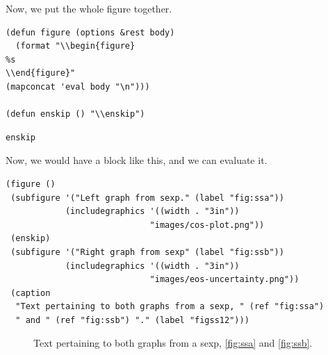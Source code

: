\documentclass[11pt]{article}
\begin{document}
Now, we put the whole figure together.

\begin{verbatim}
(defun figure (options &rest body)
  (format "\\begin{figure}
%s
\\end{figure}"
(mapconcat 'eval body "\n")))

(defun enskip () "\\enskip")
\end{verbatim}
\begin{verbatim}
enskip
\end{verbatim}

Now, we would have a block like this, and we can evaluate it.

\begin{verbatim}
(figure ()
 (subfigure '("Left graph from sexp." (label "fig:ssa"))
            (includegraphics '((width . "3in"))
                             "images/cos-plot.png"))
 (enskip)
 (subfigure '("Right graph from sexp" (label "fig:ssb"))
            (includegraphics '((width . "3in"))
                             "images/eos-uncertainty.png"))
 (caption
  "Text pertaining to both graphs from a sexp, " (ref "fig:ssa")
  " and " (ref "fig:ssb") "." (label "figss12")))
\end{verbatim}

\begin{figure}
\enskip
{}
\caption{Text pertaining to both graphs from a sexp, \ref{fig:ssa} and \ref{fig:ssb}.\label{figss12}}
\end{figure}
\end{document}
